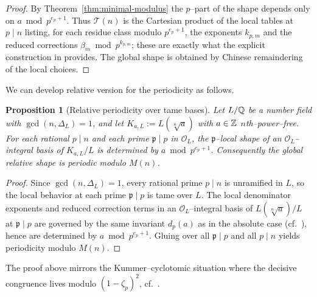 \documentclass[12pt,a4paper,oneside]{amsart}
\newtheorem{proposition}[theorem]{Proposition}
\theoremstyle{definition}
\begin{document}
\begin{proof}
By Theorem~\ref{thm:minimal-modulus} the $p$–part of the shape depends only on
$a\bmod p^{e_p+1}$.  Thus $\mathcal T(n)$ is the Cartesian product of the local tables at
$p\mid n$ listing, for each residue class modulo $p^{e_p+1}$, the exponents $k_{p,m}$ and the
reduced corrections $\beta_m\bmod p^{k_{p,m}}$; these are exactly what the explicit construction in \cite[Theorem~1.6 and Theorem~1.8]{JKS21} provides. The global shape is obtained by Chinese remaindering of the local choices.
\end{proof}

We can develop relative version for the periodicity as follows. 

\begin{proposition}[Relative periodicity over tame bases]\label{prop:relative}
Let $L/\Bbb Q$ be a number field with $\gcd(n,\Delta_L)=1$, and let $K_{a,L}:=L(\sqrt[n]{a})$
with $a\in\Bbb Z$ $n$th–power–free.  For each rational $p\mid n$ and each prime $\mathfrak p\mid p$
in $\mathcal O_L$, the $\mathfrak p$–local shape of an $\mathcal O_L$–integral basis of
$K_{a,L}/L$ is determined by $a\bmod p^{e_p+1}$.  Consequently the global \emph{relative} shape is periodic modulo $M(n)$.
\end{proposition}

\begin{proof}
Since $\gcd(n,\Delta_L)=1$, every rational prime $p\mid n$ is unramified in $L$, so the local behavior at each prime $\mathfrak p\mid p$ is tame over $L$. The local denominator exponents and reduced correction terms in an $\mathcal O_L$--integral basis of $L(\sqrt[n]{a})/L$ at $\mathfrak p\mid p$ are governed by the same invariant $d_p(a)$ as in the absolute
case (cf.\ \cite{JKS21}), hence are determined by $a\bmod p^{e_p+1}$. Gluing over all $\mathfrak p\mid p$ and all $p\mid n$ yields periodicity modulo $M(n)$.
\end{proof}

The proof above mirrors the Kummer–cyclotomic situation where the decisive congruence lives modulo $(1-\zeta_p)^2$, cf.\ \cite[Theorem.\,1.1 and \S6]{Smi21}.
\end{document}
